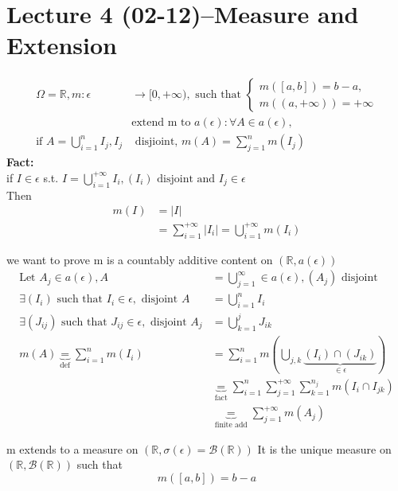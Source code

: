 \section{Lecture 4 (02-12)--{Measure and Extension}}
\begin{align*}{}{}
\Omega=\mathbb{R},m:\epsilon&\rightarrow[0,+\infty),\text{ such that }\begin{cases}
    m([a,b])=b-a, \\ m((a,+\infty))=+\infty
\end{cases}\\
&\text{extend  m  to } a(\epsilon): \forall A\in a(\epsilon),\\
\text{if } A=\bigcup_{i=1}^{n}I_j, I_j &\text{ disjioint, } m(A)=\sum_{j=1}^{n}m(I_j)
\end{align*}
\textbf{Fact:}
\\if $ I\in \epsilon $ s.t. $ I=\bigcup_{i=1}^{+\infty}I_i,(I_i)\text{ disjoint and }I_j\in\epsilon $
\\Then \begin{align*}{}{}
m(I)&=|I|\\
&=\sum_{i=1}^{+\infty}|I_i|=\bigcup_{i=1}^{+\infty}m(I_i)
\end{align*}  
\begin{lemma}[]{}
we want to prove m is a countably additive content on $(\mathbb{R},a(\epsilon))$\\
\begin{align*}{}{}
\text{Let }  A_j\in a(\epsilon),A&=\bigcup_{j=1}^{\infty}\in a(\epsilon),(A_j)\text{ disjoint} \\
\exists (I_i) \text{ such that } I_i\in\epsilon,\text{ disjoint } A&=\bigcup_{i=1}^{n}I_i\\
\exists (J_{ij}) \text{ such that } J_{ij}\in\epsilon,\text{ disjoint } A_j&=\bigcup_{k=1}^{j}J_{ik}\\
m(A)\underbrace{=}_{\text{def}}\sum_{i=1}^{n}m(I_i)&=\sum_{i=1}^{n}m(\bigcup_{j,k}\underbrace{(I_i)\cap(J_{ik})}_{\in\epsilon})\\
&\underbrace{=}_{\text{fact}}\sum_{i=1}^{n}\sum_{j=1}^{+\infty}\sum_{k=1}^{n_j}m(I_i\cap I_{jk})\\
&\underbrace{=}_{\text{finite add}}\sum_{j=1}^{+\infty}m(A_j)
\end{align*}
\end{lemma}
\begin{theorem}[]{}
m extends to a measure on $(\mathbb{R},\sigma(\epsilon)=\mathcal{B}(\mathbb{R}))$ It is the unique measure on $(\mathbb{R},\mathcal{B} (\mathbb{R}))$ such that
$$
    m([a,b])=b-a
$$ 
\end{theorem}
